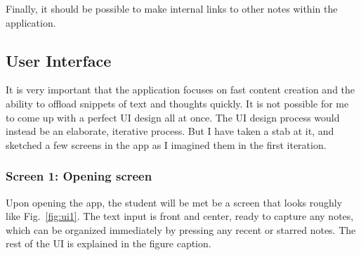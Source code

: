 Finally, it should be possible to make internal links to other notes
within the application.

\subsection{User Interface}\label{user-interface}

It is very important that the application focuses on fast content
creation and the ability to offload snippets of text and thoughts
quickly. It is not possible for me to come up with a perfect UI design
all at once. The UI design process would instead be an elaborate,
iterative process. But I have taken a stab at it, and sketched a few
screens in the app as I imagined them in the first iteration.

\subsubsection{Screen 1: Opening screen}\label{screen-1-opening-screen}

Upon opening the app, the student will be met be a screen that looks
roughly like Fig.~\ref{fig:ui1}. The text input is front and center,
ready to capture any notes, which can be organized immediately by
pressing any recent or starred notes. The rest of the UI is explained in
the figure caption.

